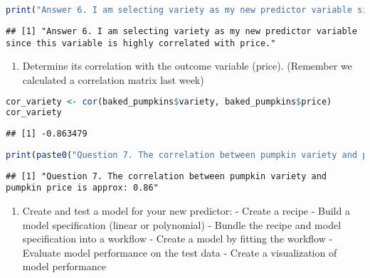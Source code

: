 \documentclass[
]{article}
\providecommand{\tightlist}{%
  \setlength{\itemsep}{0pt}\setlength{\parskip}{0pt}}
\begin{document}
\begin{lstlisting}[language=R]
print("Answer 6. I am selecting variety as my new predictor variable since this variable is highly correlated with price.")
\end{lstlisting}

\begin{lstlisting}
## [1] "Answer 6. I am selecting variety as my new predictor variable since this variable is highly correlated with price."
\end{lstlisting}

\begin{enumerate}
\def\labelenumi{\arabic{enumi}.}
\setcounter{enumi}{6}
\tightlist
\item
  Determine its correlation with the outcome variable (price). (Remember
  we calculated a correlation matrix last week)
\end{enumerate}

\begin{lstlisting}[language=R]
cor_variety <- cor(baked_pumpkins$variety, baked_pumpkins$price)
cor_variety
\end{lstlisting}

\begin{lstlisting}
## [1] -0.863479
\end{lstlisting}

\begin{lstlisting}[language=R]
print(paste0("Question 7. The correlation between pumpkin variety and pumpkin price is approx: ", round(abs(cor_variety), 2)))
\end{lstlisting}

\begin{lstlisting}
## [1] "Question 7. The correlation between pumpkin variety and pumpkin price is approx: 0.86"
\end{lstlisting}

\begin{enumerate}
\def\labelenumi{\arabic{enumi}.}
\setcounter{enumi}{7}
\tightlist
\item
  Create and test a model for your new predictor: - Create a recipe -
  Build a model specification (linear or polynomial) - Bundle the recipe
  and model specification into a workflow - Create a model by fitting
  the workflow - Evaluate model performance on the test data - Create a
  visualization of model performance
\end{enumerate}
\end{document}
